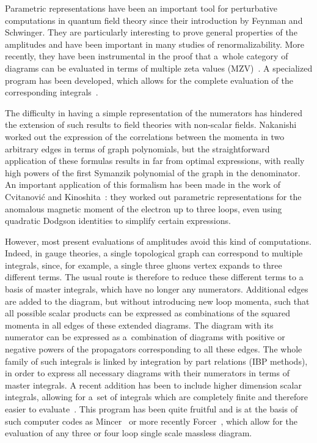 \documentclass[pdftex]{sigma}
\numberwithin{equation}{section}
\begin{document}
Parametric representations have been an important tool for perturbative computations
in quantum field theory since their introduction by Feynman and Schwinger.
They are particularly interesting to prove general properties of the amplitudes and have been important
in many studies of renormalizability. More recently, they have been instrumental in the proof that a~whole
category of diagrams can be evaluated in terms of multiple zeta values (MZV)~\cite{Br2009,Brown_2008}.
A specialized program has been developed, which allows for the complete evaluation of the corresponding integrals~\cite{Pa13}.

The difficulty in having a simple representation of the numerators has hindered the
extension of such results to field theories with non-scalar fields. Nakanishi~\cite{Na71} worked out the
expression of the correlations between the momenta in two arbitrary edges in terms of graph polynomials, but the
straightforward application of these formulas results in far from optimal expressions, with really high powers of the first
Symanzik polynomial of the graph in the denominator. An important application of this formalism has been made in the work of Cvitanovi{\'c} and
Kinoshita~\cite{CvKi74}: they worked out parametric representations for the anomalous magnetic moment of the electron up to three loops,
even using quadratic Dodgson identities to simplify certain expressions.

However, most present evaluations of amplitudes avoid this kind of computations. Indeed, in gauge theories, a single topological graph can correspond
to multiple integrals, since, for example, a single three gluons vertex expands to three different terms. The usual route is therefore to reduce these
different terms to a basis of master integrals, which have no longer any numerators. Additional edges are added to the
diagram, but without introducing new loop momenta, such that all possible scalar products can be expressed as combinations
of the squared momenta in all edges of these extended diagrams. The diagram with its numerator can be expressed as a~combination of diagrams with positive or negative powers of the propagators corresponding to all these edges.
The whole family of such integrals is linked by integration by part relations (IBP methods), in order
to express all necessary diagrams with their numerators in terms of master integrals. A recent addition
has been to include higher dimension scalar integrals, allowing for a~set of integrals which are
completely finite and therefore easier to evaluate~\cite{MaPaSch14}. This program has been quite fruitful
and is at the basis of such computer codes as Mincer~\cite{mincer1,mincer2} or more recently
Forcer~\cite{UeRuVe16},
which allow for the evaluation of any three or four loop single scale massless diagram.
\end{document}
